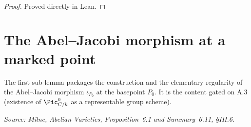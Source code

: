 \begin{proof} Proved directly in Lean. \end{proof}

\section{The Abel--Jacobi morphism at a marked point}
\label{sec:albaneseup_abel_jacobi}

The first sub-lemma packages the construction and the elementary regularity of
the Abel--Jacobi morphism \(\iota_{P_0}\) at the basepoint \(P_0\). It is the
content gated on A.3 (existence of \(\Pic^0_{C/k}\) as a representable group
scheme).

\begin{lemma}
  \label{lem:abel_jacobi_morphism}

  \textit{Source: Milne, \emph{Abelian Varieties}, Proposition~6.1 and
  Summary~6.11, \S III.6.}


\end{lemma}

